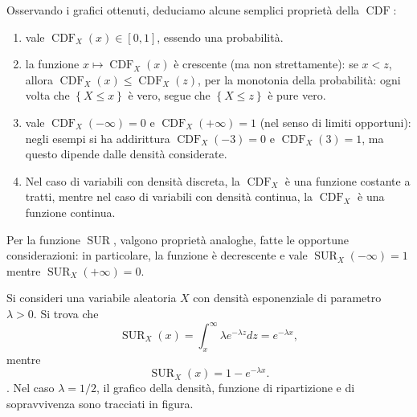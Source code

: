 \documentclass[
  italian,
  letterpaper,
]{book}
\providecommand{\tightlist}{%
  \setlength{\itemsep}{0pt}\setlength{\parskip}{0pt}}
\newcommand{\cur}[1]{\left\{ #1 \right\}}
\newcommand{\SUR}{\operatorname{SUR}}
\newcommand{\CDF}{\operatorname{CDF}}
\theoremstyle{definition}
\theoremstyle{remark}
\begin{document}
Osservando i grafici ottenuti, deduciamo alcune semplici proprietà della
\(\CDF\):

\begin{enumerate}
\def\labelenumi{\arabic{enumi}.}
\tightlist
\item
  vale \(\CDF_X(x) \in [0,1]\), essendo una probabilità.
\item
  la funzione \(x \mapsto \CDF_X(x)\) è crescente (ma non strettamente):
  se \(x < z\), allora \(\CDF_X(x) \le \CDF_X(z)\), per la monotonia
  della probabilità: ogni volta che \(\cur{X \le x}\) è vero, segue che
  \(\cur{X \le z}\) è pure vero.
\item
  vale \(\CDF_X(-\infty) = 0\) e \(\CDF_X(+\infty)=1\) (nel senso di
  limiti opportuni): negli esempi si ha addirittura \(\CDF_X(-3)=0\) e
  \(\CDF_X(3)=1\), ma questo dipende dalle densità considerate.
\item
  Nel caso di variabili con densità discreta, la \(\CDF_X\) è una
  funzione costante a tratti, mentre nel caso di variabili con densità
  continua, la \(\CDF_X\) è una funzione continua.
\end{enumerate}

Per la funzione \(\SUR\), valgono proprietà analoghe, fatte le opportune
considerazioni: in particolare, la funzione è decrescente e vale
\(\SUR_X(-\infty) = 1\) mentre \(\SUR_X(+\infty) = 0\).

Si consideri una variabile aleatoria \(X\) con densità esponenziale di
parametro \(\lambda>0\). Si trova che
\[ \SUR_X(x) = \int_x^\infty \lambda e^{-\lambda z} d z = e^{-\lambda x},\]
mentre \[ \SUR_X(x) = 1- e^{-\lambda x}.\]. Nel caso \(\lambda = 1/2\),
il grafico della densità, funzione di ripartizione e di sopravvivenza
sono tracciati in figura.
\end{document}
